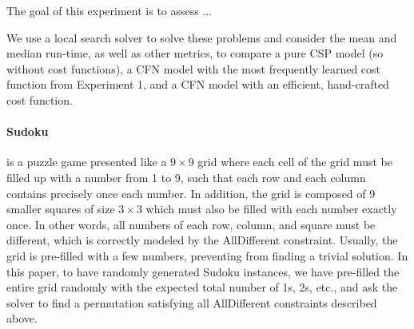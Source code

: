 \documentclass{article}
\newcommand{\csp}{\textsc{CSP}\xspace}
\newcommand{\cfn}{\textsc{CFN}\xspace}
\begin{document}
The goal of this experiment is to assess ...

We use a local search solver to solve these problems and consider the mean and median run-time, as well as other metrics, to compare a pure \csp model (so without cost functions),  a \cfn model with the most frequently learned cost function from Experiment 1, and a \cfn model with an efficient, hand-crafted cost function.

\paragraph{Sudoku} is a puzzle game presented like a $9 \times 9$ grid where each cell of the grid must be filled up with a number from 1 to 9,  such that each row and each column contains precisely once each number. In addition, the grid is composed of 9 smaller squares of size $3  \times 3$  which must also be filled with each number exactly once. In other words, all numbers of each row, column, and square must be different,   which is correctly modeled by the  AllDifferent constraint.   Usually, the grid is pre-filled with a few numbers, preventing from finding a trivial solution.  In this paper,  to have randomly generated Sudoku instances, we have pre-filled the entire grid randomly with the expected total number of 1s, 2s, etc., and ask the solver to find a  permutation satisfying all  AllDifferent constraints described above.


\end{document}

